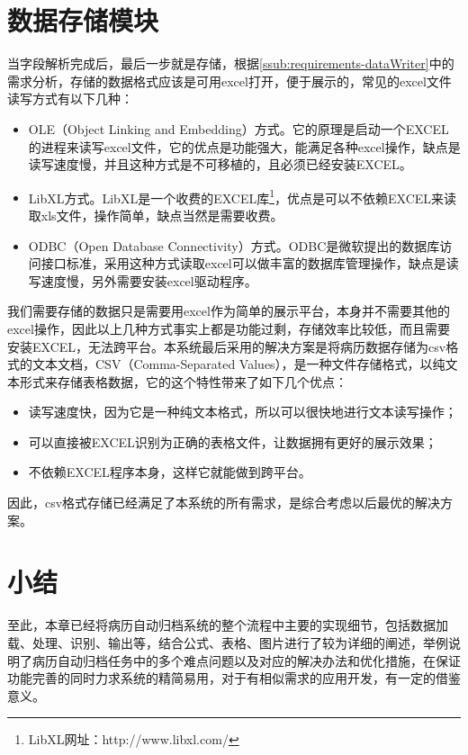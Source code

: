 \section{数据存储模块} %
当字段解析完成后，最后一步就是存储，根据\autoref{ssub:requirements-dataWriter}中的需求分析，存储的数据格式应该是可用excel打开，便于展示的，常见的excel文件读写方式有以下几种：
\begin{itemize}
	\item OLE（Object Linking and Embedding）方式。它的原理是启动一个EXCEL的进程来读写excel文件，它的优点是功能强大，能满足各种excel操作，缺点是读写速度慢，并且这种方式是不可移植的，且必须已经安装EXCEL。
	\item LibXL方式。LibXL是一个收费的EXCEL库\footnote{LibXL网址：http://www.libxl.com/}，优点是可以不依赖EXCEL来读取xls文件，操作简单，缺点当然是需要收费。
	\item ODBC（Open Database Connectivity）方式。ODBC是微软提出的数据库访问接口标准，采用这种方式读取excel可以做丰富的数据库管理操作，缺点是读写速度慢，另外需要安装excel驱动程序。
\end{itemize}
我们需要存储的数据只是需要用excel作为简单的展示平台，本身并不需要其他的excel操作，因此以上几种方式事实上都是功能过剩，存储效率比较低，而且需要安装EXCEL，无法跨平台。本系统最后采用的解决方案是将病历数据存储为csv格式的文本文档，CSV（Comma-Separated Values），是一种文件存储格式，以纯文本形式来存储表格数据，它的这个特性带来了如下几个优点：
\begin{itemize}
	\item 读写速度快，因为它是一种纯文本格式，所以可以很快地进行文本读写操作；
	\item 可以直接被EXCEL识别为正确的表格文件，让数据拥有更好的展示效果；
	\item 不依赖EXCEL程序本身，这样它就能做到跨平台。
\end{itemize}
因此，csv格式存储已经满足了本系统的所有需求，是综合考虑以后最优的解决方案。

\section{小结}
至此，本章已经将病历自动归档系统的整个流程中主要的实现细节，包括数据加载、处理、识别、输出等，结合公式、表格、图片进行了较为详细的阐述，举例说明了病历自动归档任务中的多个难点问题以及对应的解决办法和优化措施，在保证功能完善的同时力求系统的精简易用，对于有相似需求的应用开发，有一定的借鉴意义。
